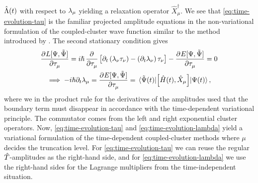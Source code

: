         $\hat{\Lambda}(t)$ with respect to $\lambda_{\mu}$ yielding a relaxation
        operator $\hat{X}^{\dagger}_{\mu}$.
        We see that \autoref{eq:time-evolution-tau} is the familiar projected
        amplitude equations in the non-variational formulation of the
        coupled-cluster wave function similar to the method introduced by
        \citeauthor{tdcc-hoodbhoy} \cite{tdcc-hoodbhoy, tdcc-hoodbhoy-2}.
        The second stationary condition gives
        \begin{gather}
            \dpd{L[\Psi, \tilde{\Psi}]}{\clustamp_{\mu}}
            = i\hslash\dpd{}{\clustamp_{\mu}}\brak{
                \partial_t\para{
                    \clustlamp_{\nu}
                    \clustamp_{\nu}
                }
                - \para{\partial_t\clustlamp_{\nu}}
                \clustamp_{\nu}
            }
            - \dpd{E[\Psi, \tilde{\Psi}]}{\clustamp_{\mu}}
            = 0 \\
            \implies
            -i\hslash\partial_t\clustlamp_{\mu}
            =
            \dpd{E[\Psi, \tilde{\Psi}]}{\clustamp_{\mu}}
            =
            \mel*{\tilde{\Psi}(t)}{
                \com{\hamil(t)}{\hat{X}_{\mu}}
            }{\Psi(t)},
            \label{eq:time-evolution-lambda}
        \end{gather}
        where we in the product rule for the derivatives of the amplitudes used
        that the boundary term must disappear in accordance with the
        time-dependent variational principle.
        The commutator comes from the left and right exponential cluster
        operators.
        Now, \autoref{eq:time-evolution-tau} and
        \autoref{eq:time-evolution-lambda} yield a variational formulation of
        the time-dependent coupled-cluster methods where $\mu$ decides the
        truncation level.
        For \autoref{eq:time-evolution-tau} we can reuse the regular
        $\hat{T}$-amplitudes as the right-hand side, and for
        \autoref{eq:time-evolution-lambda} we use the right-hand sides for the
        Lagrange multipliers from the time-independent situation.

